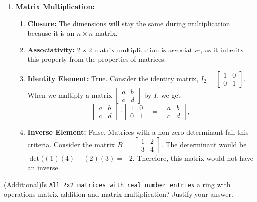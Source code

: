 {\begin{enumerate}
\begin{enumerate}[label=(\arabic*)]
            
        \end{enumerate}
        \item \textbf{Matrix Multiplication:} \xmark
        \begin{enumerate}[label=(\arabic*)]
            \item \textbf{Closure:} The dimensions will stay the same during multiplication because it is an $n \times n$ matrix. 
            \item \textbf{Associativity:} $2 \times 2$ matrix multiplication is associative, as it inherits this property from the properties of matrices.
            \item \textbf{Identity Element:} True. Consider the identity matrix, $I_2 =
            \begin{bmatrix}
                1 & 0 \\
                0 & 1
            \end{bmatrix}$. When we multiply a matrix $\begin{bmatrix}
                a & b \\
                c & d
            \end{bmatrix}$ by $I$, we get $$\begin{bmatrix}
                a & b \\
                c & d
            \end{bmatrix} \cdot
            \begin{bmatrix}
                1 & 0 \\
                0 & 1
            \end{bmatrix} = \begin{bmatrix}
                a & b \\
                c & d
            \end{bmatrix},$$
            \item \textbf{Inverse Element:} False. Matrices with a non-zero determinant fail this criteria. Consider the matrix $B =$
            $\begin{bmatrix}
                1 & 2 \\
                3 & 4 
            \end{bmatrix}$. The determinant would be $\det((1)(4) - (2)(3) = -2$. Therefore, this matrix would not have an inverse. 
        \end{enumerate}
    \end{enumerate}
}

\begin{exercise}
    {(Additional)}Is \texttt{All 2x2 matrices with real number entries} a ring with operations matrix addition and matrix multiplication? Justify your answer.
\end{exercise}

